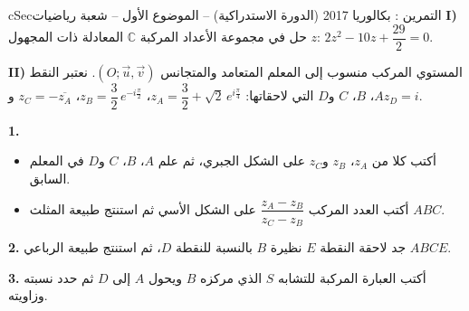 \documentclass[12pt,a4paper]{article}
\newenvironment{BOX}[2]{\begin{otherlanguage}{english}\begin{arbox}{#1}{#2}}{\end{arbox}\end{otherlanguage}}
\newcounter{exo}
\newenvironment{tamrin}[1]{\stepcounter{exo}\begin{BOX}{cSec}{التمرين \theexo: #1}}{\end{BOX}}
\newenvironment{sq}{\begin{itemize}[leftmargin=2.4em,itemsep=3pt]}{\end{itemize}}
\newcommand{\qa}{\item[(أ)]}\newcommand{\qb}{\item[(ب)]}\newcommand{\qc}{\item[(جـ)]}\newcommand{\qd}{\item[(د)]}\newcommand{\qe}{\item[(هـ)]}
\newcommand{\QQ}[1]{\par\smallskip\textbf{#1.} }
\begin{document}
\begin{tamrin}{بكالوريا 2017 (الدورة الاستدراكية) -- الموضوع الأول -- شعبة رياضيات}
\textbf{I)} حل في مجموعة الأعداد المركبة $\mathbb{C}$ المعادلة ذات المجهول $z$: $2z^2-10z+\dfrac{29}{2}=0$.

\textbf{II)} المستوي المركب منسوب إلى المعلم المتعامد والمتجانس $\left(O;\vec u,\vec v\right)$.
نعتبر النقط $A$، $B$، $C$ و$D$ التي لاحقاتها: $z_A=\dfrac32+\sqrt2\,e^{i\frac{\pi}{4}}$، $z_B=\dfrac32\,e^{-i\frac{\pi}{2}}$، $z_C=-\overline{z_A}$ و$z_D=i$.

\QQ{1}
\begin{sq}
\qa أكتب كلا من $z_A$، $z_B$ و$z_C$ على الشكل الجبري، ثم علم $A$، $B$، $C$ و$D$ في المعلم السابق.
\qb أكتب العدد المركب $\dfrac{z_A-z_B}{z_C-z_B}$ على الشكل الأسي ثم استنتج طبيعة المثلث $ABC$.
\end{sq}
\QQ{2} جد لاحقة النقطة $E$ نظيرة $B$ بالنسبة للنقطة $D$، ثم استنتج طبيعة الرباعي $ABCE$.

\QQ{3} أكتب العبارة المركبة للتشابه $S$ الذي مركزه $B$ ويحول $A$ إلى $D$ ثم حدد نسبته وزاويته.

\end{tamrin}
\end{document}
